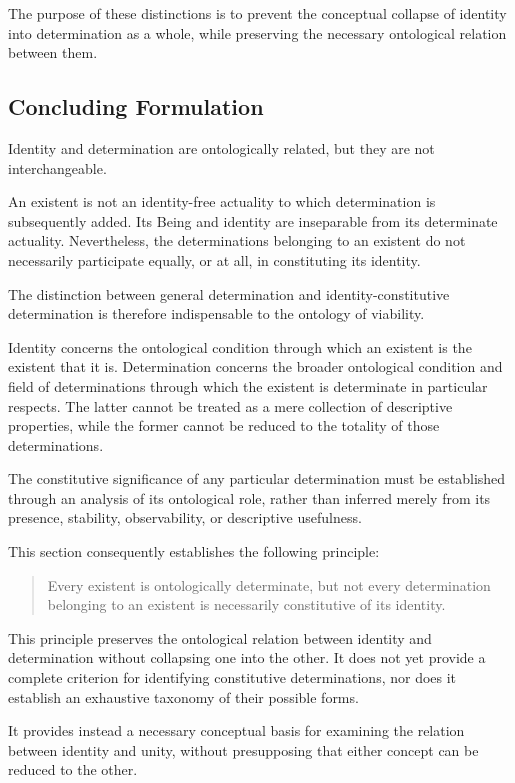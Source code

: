 The purpose of these distinctions is to prevent the
conceptual collapse of identity into determination as
a whole, while preserving the necessary ontological
relation between them.

\subsection{Concluding Formulation}

Identity and determination are ontologically related,
but they are not interchangeable.

An existent is not an identity-free actuality to which
determination is subsequently added. Its Being and
identity are inseparable from its determinate actuality.
Nevertheless, the determinations belonging to an existent
do not necessarily participate equally, or at all,
in constituting its identity.

The distinction between general determination and
identity-constitutive determination is therefore
indispensable to the ontology of viability.

Identity concerns the ontological condition through
which an existent is the existent that it is.
Determination concerns the broader ontological condition
and field of determinations through which the existent
is determinate in particular respects. The latter
cannot be treated as a mere collection of descriptive
properties, while the former cannot be reduced to the
totality of those determinations.

The constitutive significance of any particular
determination must be established through an analysis
of its ontological role, rather than inferred merely
from its presence, stability, observability, or
descriptive usefulness.

This section consequently establishes the following
principle:

\begin{quote}
Every existent is ontologically determinate, but not
every determination belonging to an existent is
necessarily constitutive of its identity.
\end{quote}

This principle preserves the ontological relation
between identity and determination without collapsing
one into the other. It does not yet provide a complete
criterion for identifying constitutive determinations,
nor does it establish an exhaustive taxonomy of their
possible forms.

It provides instead a necessary conceptual basis for
examining the relation between identity and unity,
without presupposing that either concept can be reduced
to the other.